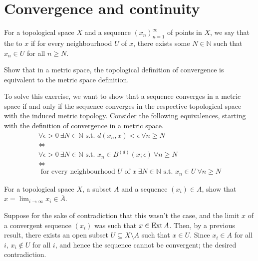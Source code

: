 \section{Convergence and continuity}
\begin{definition}
	For a topological space $ X $ and a sequence $ ( x_{n} )_{n=1}^{\infty} $ of points in $ X $, we say that the  to $ x $ if for every neighbourhood $ U $ of $ x $, there exists some $ N \in \mathbb{N} $ such that $ x_{n} \in U $ for all $ n \geq N $.
\end{definition}

\begin{exercise}
	\begin{problem}
	Show that in a metric space, the topological definition of convergence is equivalent to the metric space definition.
	\end{problem}
	\begin{solution}
		To solve this exercise, we want to show that a sequence converges in a metric space if and only if the sequence converges in the respective topological space with the induced metric topology. Consider the following equivalences, starting with the definition of convergence in a metric space.
		\begin{gather*}
			\forall \epsilon>0 \ \exists N \in \mathbb{N} \text{ s.t. } d ( x_{n}, x )< \epsilon \ \forall n \geq N\\
			\iff \\
			\forall \epsilon>0 \ \exists N \in \mathbb{N} \text{ s.t. } x_{n} \in B^{(d)}( x;\epsilon ) \ \forall n \geq N\\
			\iff \\
			\text{ for every neighbourhood } U \text{ of } x \ \exists N \in \mathbb{N} \text{ s.t. } x_{n}\in U \ \forall n \geq N
		\end{gather*}
	\end{solution}
\end{exercise}

\begin{exercise}
	\begin{problem}
	For a topological space $ X $, a subset $ A $ and a sequence $ ( x_{i} )\in A $, show that $ x = \lim_{i \to \infty}{x_{i}} \in \overline{A} $.
	\end{problem}
	\begin{solution}
		Suppose for the sake of contradiction that this wasn't the case, and the limit $ x $ of a convergent sequence $ ( x_{i} ) $ was such that $ x \in \operatorname{Ext}{A} $. Then, by a previous result, there exists an open subset $ U \subseteq X \setminus A $ such that $ x \in U $. Since $ x_{i}\in A $ for all $ i $, $ x_{i} \not \in U $ for all $ i $, and hence the sequence cannot be convergent; the desired contradiction.
	\end{solution}
\end{exercise}

